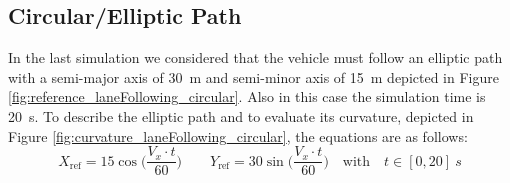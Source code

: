 \subsection{Circular/Elliptic Path}
In the last simulation we considered that the vehicle must follow an elliptic path with a semi-major axis of \SI{30}{m} and semi-minor axis of \SI{15}{m} depicted in Figure \ref{fig:reference_laneFollowing_circular}. Also in this case the simulation time is \SI{20}{s}.
To describe the elliptic path and to evaluate its curvature, depicted in Figure \ref{fig:curvature_laneFollowing_circular}, the equations are as follows:
\begin{equation}
	X_\text{ref}=\displaystyle 15\cos\Bigg(\frac{V_x\cdot t}{60}\Bigg) \qquad
	Y_\text{ref}=\displaystyle 30\sin\Bigg(\frac{V_x\cdot t}{60}\Bigg)  
 \quad\text{with}\quad t\in[0,20]\SI{}{s}
\end{equation}
